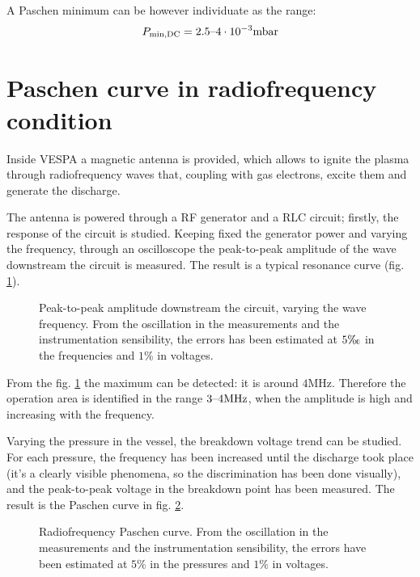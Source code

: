 \documentclass[11pt,a4 paper]{article}
\begin{document}
A Paschen minimum can be however individuate as the range:
\begin{equation*}
  P_{\text{min,DC}} = 2.5\textup{--}4\cdot10^{-3}\si{\milli\bar}
\end{equation*}

\section{Paschen curve in radiofrequency condition}
Inside VESPA a magnetic antenna is provided, which allows to ignite the plasma through radiofrequency waves that, coupling with gas electrons, excite them and generate the discharge.

The antenna is powered through a RF generator and a RLC circuit; firstly, the response of the circuit is studied. Keeping fixed the generator power and varying the frequency, through an oscilloscope the peak-to-peak amplitude of the wave downstream the circuit is measured. The result is a typical resonance curve (fig. \ref{fig:RF:response}).

\begin{figure}[H]
  \centering
  \caption{Peak-to-peak amplitude downstream the circuit, varying the wave frequency.  From the oscillation in the measurements and the instrumentation sensibility, the errors has been estimated at $5\tcperthousand$ in the frequencies and $1\%$ in voltages.}
  \label{fig:RF:response}
\end{figure}

From the fig. \ref{fig:RF:response} the maximum can be detected: it is around $4\si{\mega\hertz}$. Therefore the operation area is identified in the range $3\textup{--}4\si{\mega\hertz}$, when the amplitude is high and increasing with the frequency.

Varying the pressure in the vessel, the breakdown voltage trend can be studied. For each pressure, the frequency has been increased until the discharge took place (it's a clearly visible phenomena, so the discrimination has been done visually), and the peak-to-peak voltage in the breakdown point has been measured. The result is the Paschen curve in fig. \ref{fig:RF:Paschen}.

\begin{figure}[H]
  \centering
  \caption{Radiofrequency Paschen curve. From the oscillation in the measurements and the instrumentation sensibility, the errors have been estimated at $5\%$ in the pressures and $1\%$ in voltages.}
  \label{fig:RF:Paschen}
\end{figure}
\end{document}
